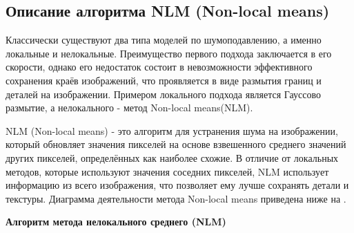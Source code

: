 \subsection{Описание алгоритма NLM (Non-local means)}	
\par Классически существуют два типа моделей по шумоподавлению, а именно локальные и нелокальные. Преимущество первого подхода заключается в его скорости, однако его недостаток состоит в невозможности эффективного сохранения краёв изображений, что проявляется в виде размытия границ и деталей на изображении. Примером локального подхода является Гауссово размытие, а нелокального - метод Non-local means(NLM)\cite{nlm2011}.
\par NLM (Non-local means) - это алгоритм для устранения шума на изображении, который обновляет значения пикселей на основе взвешенного среднего значений других пикселей, определённых как наиболее схожие. В отличие от локальных методов, которые используют значения соседних пикселей, NLM использует информацию из всего изображения, что позволяет ему лучше сохранять детали и текстуры. Диаграмма деятельности метода Non-local means приведена ниже на .
\par \textbf{Алгоритм метода нелокального среднего (NLM)}\cite{nlm2015}
